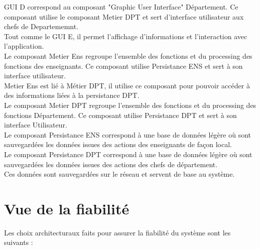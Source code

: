     GUI D correspond au composant "Graphic User Interface" Département.
    Ce composant utilise le composant Metier DPT et sert d'interface utilisateur aux chefs de Departememnt.\\ Tout comme le GUI E, il permet l'affichage d'informations et l'interaction avec l'application.\\
    
    Le composant Metier Ens regroupe l'ensemble des fonctions et du processing des fonctions des enseignants. Ce composant utilise Persistance ENS et sert à son interface utilisateur. \\
    Metier Ens est lié à Métier DPT, il utilise ce composant pour pouvoir accéder à des informations liées à la persistance DPT.\\
        
    Le composant Metier DPT regroupe l'ensemble des fonctions et du processing des fonctions Département. Ce composant utilise Persistance DPT et sert à son interface Utilisateur.\\
    
    Le composant Persistance ENS correspond à une base de données légère où sont sauvegardées les données issues des actions des enseignants de façon local.\\
    
    Le composant Persistance DPT correspond à une base de données légère où sont sauvegardées les données issues des actions des chefs de département.\\
    Ces données sont sauvegardées sur le réseau et servent de base au système.\\
    
\section{Vue de la fiabilité} 

    Les choix architecturaux faits pour assurer la fiabilité du système sont les suivants :
    
